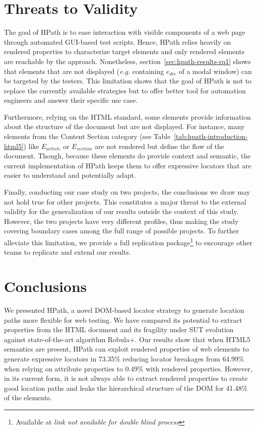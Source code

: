 \section{Threats to Validity}

The goal of HPath is to ease interaction with visible components of a web page through automated GUI-based test scripts. Hence, HPath relies heavily on rendered properties to characterize target elements and only rendered elements are reachable by the approach. Nonetheless, section~\ref{sec:hpath-results-rq1} shows that elements that are not displayed (\emph{e.g.} containing $e_{div}$ of a modal window) can be targeted by the testers. This limitation shows that the goal of HPath is not to replace the currently available strategies but to offer better tool for automation engineers and answer their specific use case.

Furthermore, relying on the HTML standard, some elements provide information about the structure of the document but are not displayed. For instance, many elements from the Content Section category (see Table~\ref{tab:hpath-introduction-html5}) like $E_{article}$ or $E_{section}$ are not rendered but define the flow of the document. Though, because these elements do provide context and semantic, the current implementation of HPath keeps them to offer expressive locators that are easier to understand and potentially adapt.

Finally, conducting our case study on two projects, the conclusions we draw may not hold true for other projects. This constitutes a major threat to the external validity for the generalization of our results outside the context of this study. However, the two projects have very different profiles, thus making the study covering boundary cases among the full range of possible projects. To further alleviate this limitation, we provide a full replication package\footnote{Available at \emph{link not available for double blind process}} to encourage other teams to replicate and extend our results.

\section{Conclusions}

We presented HPath, a novel DOM-based locator strategy to generate location paths more flexible for web testing. We have compared its potential to extract properties from the HTML document and its fragility under SUT evolution against state-of-the-art algorithm Robula+. Our results show that when HTML5 semantics are present, HPath can exploit rendered properties of web elements to generate expressive locators in 73.35\% reducing locator breakages from 64.99\% when relying on attribute properties to 0.49\% with rendered properties. However, in its current form, it is not always able to extract rendered properties to create good location paths and  leaks the hierarchical structure of the DOM for 41.48\% of the elements.

